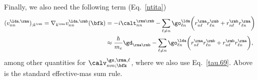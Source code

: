 \documentclass[floatfix,prb,aps,superscriptaddress,11pt,preprint,letterpaper]{revtex4}
\begin{document}
Finally,
we also need the following term (Eq.~\eqref{ntita})
\begin{align}\label{a.3c}
(v^{\lda,\rma}_{nn})_{;k^\rmb}
=
\nabla_{k^{\rma}}  
v^{\lda,\rmb}_{nn}(\bfk)
&=
-i\calt^{\rma\rmb}_{nn}
-
\sum_{\ell\ne n}
\go^\lda_{\ell n}
\bigg(  
r^{\rma}_{n\ell}  
r^\rmb_{\ell n}
+  
r^\rmb_{n\ell}  
r^{\rma}_{\ell n}
\bigg)
\nonumber\\
&\approx
\frac{\hbar}{m_e}\gd_{\rma\rmb}
-
\sum_{\ell\ne n}
\go^\lda_{\ell n}
\bigg(  
r^{\rma}_{n\ell}  
r^\rmb_{\ell n}
+  
r^\rmb_{n\ell}  
r^{\rma}_{\ell n}
\bigg)
,
\end{align}  
among other quantities for $\calv^{\gs,\rma,\ell}_{nm;\bfk}$, where we 
also use Eq.~\eqref{tau.69}. Above is the standard effective-mas sum rule.
\cite{ashcroft_solid_1976} 
\end{document}
